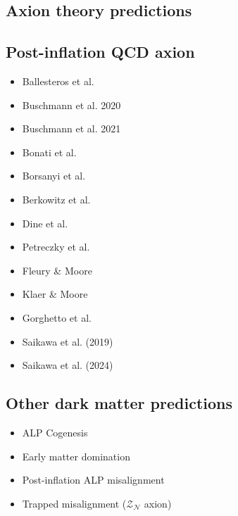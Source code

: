 \documentclass[8pt,twocolumn]{extarticle}
\begin{document}
\begin{mdframed}
\vspace{-1em}
\section{Axion theory predictions}\vspace{-0.5em}
\subsection{Post-inflation QCD axion}
\begin{itemize}\setlength\itemsep{-0.5em}
	\item Ballesteros et al.~\cite{Ballesteros:2016euj}	
	\item Buschmann et al. 2020~\cite{Buschmann:2019icd}
	\item Buschmann et al. 2021~\cite{Buschmann:2021sdq}
	\item Bonati et al.~\cite{Bonati:2015vqz}
	\item Borsanyi et al.~\cite{Borsanyi:2016ksw}
	\item Berkowitz et al.~\cite{Berkowitz:2015aua}
	\item Dine et al.~\cite{Dine:2017swf}
	\item Petreczky et al.~\cite{Petreczky:2016vrs}
	\item Fleury \& Moore~\cite{Fleury:2015aca}
	\item Klaer \& Moore~\cite{Klaer:2017ond}
	\item Gorghetto et al.~\cite{Gorghetto:2021fsn}
	\item Saikawa et al. (2019)~\cite{IAXO:2019mpb}	
	\item Saikawa et al. (2024)~\cite{Saikawa:2024bta}
\end{itemize}

\subsection{Other dark matter predictions}
\begin{itemize}\setlength\itemsep{-0.5em}
	\item ALP Cogenesis~\cite{Co:2020xlh}
	\item Early matter domination~\cite{Blinov:2019rhb}
	\item Post-inflation ALP misalignment~\cite{Arias:2012az,OHare:2021zrq}
	\item Trapped misalignment ($\mathcal{Z}_\mathcal{N}$ axion)~\cite{DiLuzio:2021gos}
\end{itemize}
\end{mdframed}
\end{document}
